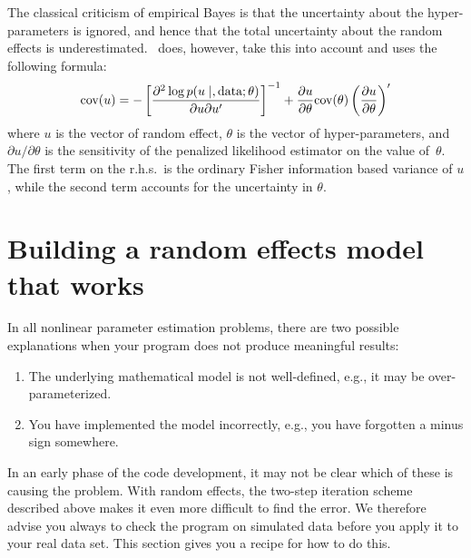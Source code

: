 \documentclass{admbmanual}
\begin{document}
The classical criticism of empirical Bayes is that the uncertainty about the
hyper-parameters is ignored, and hence that the total uncertainty about the
random effects is underestimated. \scAR\ does, however, take this into account
and uses the following formula:
\begin{equation}
\textrm{cov}(u)
  =
    -\left[\frac{\partial^{2}\log p(u \mid, \hbox{data};\theta)}
  {\partial u\partial u^{\prime}}\right]^{-1}+ \frac{
  \partial u}{\partial\theta}
  \hbox{cov}(\theta) \left(\frac{\partial u}{\partial\theta}\right)^{\prime}
  \label{eq:EB_variance}
\end{equation}
where $u$ is the vector of random effect, $\theta$ is the vector of
hyper-parameters, and $\partial u/\partial\theta$ is the sensitivity of the
penalized likelihood estimator on the value of~$\theta$. The first term on the
r.h.s.~is the ordinary Fisher information based variance of $u$, while the
second term accounts for the uncertainty in $\theta$.

\section{Building a random effects model that works}

In all nonlinear parameter estimation problems, there are two possible
explanations when your program does not produce meaningful results:
\begin{enumerate}
\item The underlying mathematical model is not well-defined, e.g., it may be
over-parameterized.
\item You have implemented the model incorrectly, e.g., you have forgotten a
minus sign somewhere.
\end{enumerate}
In an early phase of the code development, it may not be clear which of these is
causing the problem. With random effects, the two-step iteration scheme
described above makes it even more difficult to find the error. We therefore
advise you always to check the program on simulated data before you apply it to
your real data set. This section gives you a recipe for how to do this.
\end{document}

